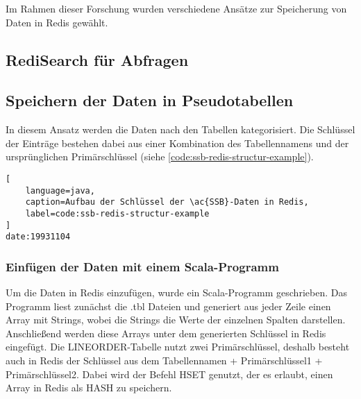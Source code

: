 Im Rahmen dieser Forschung wurden verschiedene Ansätze zur Speicherung von Daten in Redis gewählt.
\subsection{RediSearch für Abfragen}


\subsection{Speichern der Daten in Pseudotabellen}
In diesem Ansatz werden die Daten nach den Tabellen kategorisiert.
Die Schlüssel der Einträge bestehen dabei aus einer Kombination des Tabellennamens und der ursprünglichen Primärschlüssel (siehe \cref{code:ssb-redis-structur-example}).

\begin{lstlisting}[
    language=java,
    caption=Aufbau der Schlüssel der \ac{SSB}-Daten in Redis,
    label=code:ssb-redis-structur-example
]
date:19931104
\end{lstlisting}

\subsubsection{Einfügen der Daten mit einem Scala-Programm}
Um die Daten in Redis einzufügen, wurde ein Scala-Programm geschrieben.
Das Programm liest zunächst die .tbl Dateien und generiert aus jeder Zeile einen Array mit Strings, wobei die Strings die Werte der einzelnen Spalten darstellen.
Anschließend werden diese Arrays unter dem generierten Schlüssel in Redis eingefügt.
Die LINEORDER-Tabelle nutzt zwei Primärschlüssel, deshalb besteht auch in Redis der Schlüssel aus dem Tabellennamen + Primärschlüssel1 + Primärschlüssel2.
Dabei wird der Befehl HSET genutzt, der es erlaubt, einen Array in Redis als HASH zu speichern.

